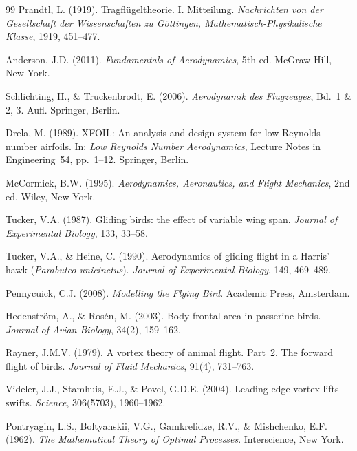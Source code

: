 ﻿\documentclass[12pt,a4paper]{article}
\theoremstyle{remark}
\begin{document}
\begin{thebibliography}{99}
		Prandtl, L. (1919). Tragflügeltheorie. I. Mitteilung. \textit{Nachrichten von der Gesellschaft der Wissenschaften zu Göttingen, Mathematisch-Physikalische Klasse}, 1919, 451--477.

		Anderson, J.D. (2011). \textit{Fundamentals of Aerodynamics}, 5th ed. McGraw-Hill, New York.

		Schlichting, H., \& Truckenbrodt, E. (2006). \textit{Aerodynamik des Flugzeuges}, Bd.~1 \& 2, 3. Aufl. Springer, Berlin.

		Drela, M. (1989). XFOIL: An analysis and design system for low Reynolds number airfoils. In: \textit{Low Reynolds Number Aerodynamics}, Lecture Notes in Engineering~54, pp.~1--12. Springer, Berlin.

		McCormick, B.W. (1995). \textit{Aerodynamics, Aeronautics, and Flight Mechanics}, 2nd ed. Wiley, New York.


		Tucker, V.A. (1987). Gliding birds: the effect of variable wing span. \textit{Journal of Experimental Biology}, 133, 33--58.

		Tucker, V.A., \& Heine, C. (1990). Aerodynamics of gliding flight in a Harris' hawk (\textit{Parabuteo unicinctus}). \textit{Journal of Experimental Biology}, 149, 469--489.

		Pennycuick, C.J. (2008). \textit{Modelling the Flying Bird}. Academic Press, Amsterdam.

		Hedenström, A., \& Rosén, M. (2003). Body frontal area in passerine birds. \textit{Journal of Avian Biology}, 34(2), 159--162.

		Rayner, J.M.V. (1979). A vortex theory of animal flight. Part~2. The forward flight of birds. \textit{Journal of Fluid Mechanics}, 91(4), 731--763.

		Videler, J.J., Stamhuis, E.J., \& Povel, G.D.E. (2004). Leading-edge vortex lifts swifts. \textit{Science}, 306(5703), 1960--1962.


		Pontryagin, L.S., Boltyanskii, V.G., Gamkrelidze, R.V., \& Mishchenko, E.F. (1962). \textit{The Mathematical Theory of Optimal Processes}. Interscience, New York.


\end{thebibliography}
\end{document}
